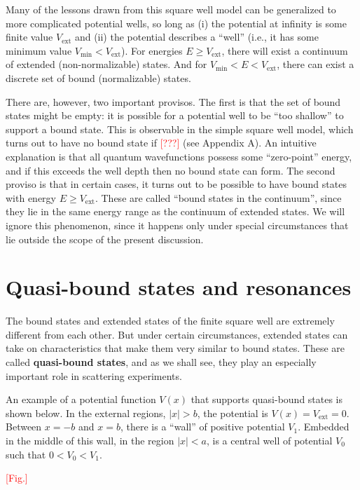 \documentclass[pra,12pt]{revtex4}
\begin{document}
Many of the lessons drawn from this square well model can be
generalized to more complicated potential wells, so long as (i) the
potential at infinity is some finite value $V_{\textrm{ext}}$ and (ii)
the potential describes a ``well'' (i.e., it has some minimum value
$V_{\mathrm{min}} < V_{\textrm{ext}}$).  For energies $E \ge
V_{\textrm{ext}}$, there will exist a continuum of extended
(non-normalizable) states.  And for $V_{\mathrm{min}} < E <
V_{\textrm{ext}}$, there can exist a discrete set of bound
(normalizable) states.

There are, however, two important provisos.  The first is that the set
of bound states might be empty: it is possible for a potential well to
be ``too shallow'' to support a bound state.  This is observable in
the simple square well model, which turns out to have no bound state
if \textcolor{red}{[???]} (see Appendix A).  An intuitive explanation
is that all quantum wavefunctions possess some ``zero-point'' energy,
and if this exceeds the well depth then no bound state can form.  The
second proviso is that in certain cases, it turns out to be possible
to have bound states with energy $E \ge V_{\textrm{ext}}$.  These are
called ``bound states in the continuum'', since they lie in the same
energy range as the continuum of extended states.  We will ignore this
phenomenon, since it happens only under special circumstances that lie
outside the scope of the present discussion.

\section{Quasi-bound states and resonances}

The bound states and extended states of the finite square well are
extremely different from each other.  But under certain circumstances,
extended states can take on characteristics that make them very
similar to bound states.  These are called \textbf{quasi-bound
  states}, and as we shall see, they play an especially important role
in scattering experiments.

An example of a potential function $V(x)$ that supports quasi-bound
states is shown below.  In the external regions, $|x| > b$, the
potential is $V(x) = V_{\textrm{ext}} = 0$.  Between $x = -b$ and $x =
b$, there is a ``wall'' of positive potential $V_1$.  Embedded in the
middle of this wall, in the region $|x| < a$, is a central well of
potential $V_0$ such that $0 < V_0 < V_1$.

\textcolor{red}{[Fig.]}
\end{document}
